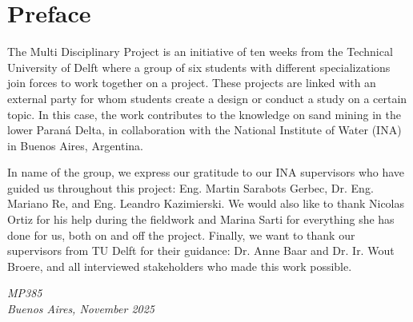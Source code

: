 \chapter*{Preface}

The Multi Disciplinary Project is an initiative of ten weeks from the Technical University of Delft where a group of six students with different specializations join forces to work together on a project. These projects are linked with an external party for whom students create a design or conduct a study on a certain topic. In this case, the work contributes to the knowledge on sand mining in the lower Paraná Delta, in collaboration with the National Institute of Water (INA) in Buenos Aires, Argentina. 

In name of the group, we express our gratitude to our INA supervisors who have guided us throughout this project: Eng. Martin Sarabots Gerbec, Dr. Eng. Mariano Re, and Eng. Leandro Kazimierski. We would also like to thank Nicolas Ortiz for his help during the fieldwork and Marina Sarti for everything she has done for us, both on and off the project. Finally, we want to thank our supervisors from TU Delft for their guidance: Dr. Anne Baar and Dr. Ir. Wout Broere, and all interviewed stakeholders who made this work possible.

\begin{flushright}
{\makeatletter\itshape
    MP385 \\
    Buenos Aires, November 2025
\makeatother}
\end{flushright}